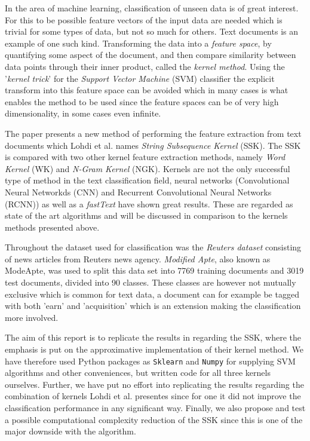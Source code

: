 
In the area of machine learning, classification of unseen data is of great interest. For this to be possible feature vectors of the input data are needed which is trivial for some types of data, but not so much for others. Text documents is an example of one such kind. Transforming the data into a \textit{feature space}, by quantifying some aspect of the document, and then compare similarity between data points through their inner product, called the \textit{kernel method}. Using the '\textit{kernel trick}' for the \textit{Support Vector Machine} (SVM) classifier the explicit transform into this feature space can be avoided which in many cases is what enables the method to be used since the feature spaces can be of very high dimensionality, in some cases even infinite.

The paper \cite{lodhi} presents a new method of performing the feature extraction from text documents which Lohdi et al. names \textit{String Subsequence Kernel} (SSK). The SSK is compared with two other kernel feature extraction methods, namely \textit{Word Kernel} (WK) and \textit{N-Gram Kernel} (NGK). Kernels are not the only successful type of method in the text classification field, neural networks (Convolutional Neural Networkds (CNN) and Recurrent Convolutional Neural Networks (RCNN)) as well as a \textit{fastText} have shown great results. These are regarded as state of the art algorithms and will be discussed in comparison to the kernels methods presented above. 

Throughout \cite{lodhi} the dataset used for classification was the \textit{Reuters dataset} consisting of news articles from Reuters news agency. \textit{Modified Apte}, also known as ModeApte, was used to split this data set into 7769 training documents and 3019 test documents, divided into 90 classes. These classes are however not mutually exclusive which is common for text data, a document can for example be tagged with both 'earn' and 'acquisition' which is an extension making the classification more involved.

The aim of this report is to replicate the results in \cite{lodhi} regarding the SSK, where the emphasis is put on the approximative implementation of their kernel method. We have therefore used Python packages as \texttt{Sklearn} and \texttt{Numpy} for supplying SVM algorithms and other conveniences, but written code for all three kernels ourselves. Further, we have put no effort into replicating the results regarding the combination of kernels Lohdi et al. presentes since for one it did not improve the classification performance in any significant way. Finally, we also propose and test a possible computational complexity reduction of the SSK since this is one of the major downside with the algorithm.

